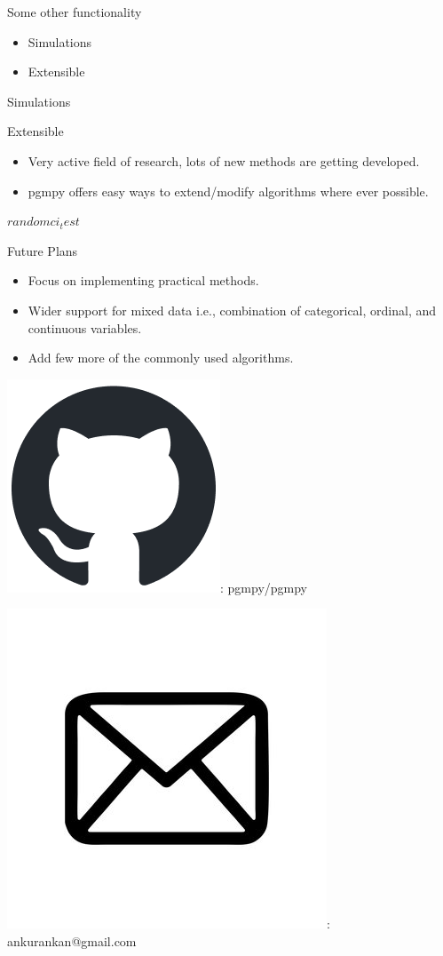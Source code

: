 \documentclass{beamer}
\newcommand\github{\includegraphics[height=3ex]{imgs/github.png}}
\newcommand\email{\includegraphics[height=3ex]{imgs/email.png}}
\begin{document}
\begin{frame}{Some other functionality}
	\begin{itemize}
		\item Simulations
		\item Extensible
	\end{itemize}
\end{frame}

\begin{frame}{Simulations}

\end{frame}

\begin{frame}{Extensible}
	\begin{itemize}
		\item Very active field of research, lots of new methods are getting developed.
		\item pgmpy offers easy ways to extend/modify algorithms where ever possible.
	\end{itemize}	
	$ random ci_test $
\end{frame}

\begin{frame}{Future Plans}
	\begin{itemize}
		\item Focus on implementing practical methods.
		\item Wider support for mixed data i.e., combination of categorical, ordinal, and continuous variables.
		\item Add few more of the commonly used algorithms.
	\end{itemize}
\end{frame}

\begin{frame}
	\vspace{5em}

	\github: pgmpy/pgmpy

	\email: ankurankan@gmail.com
\end{frame}

% 
\end{document}
